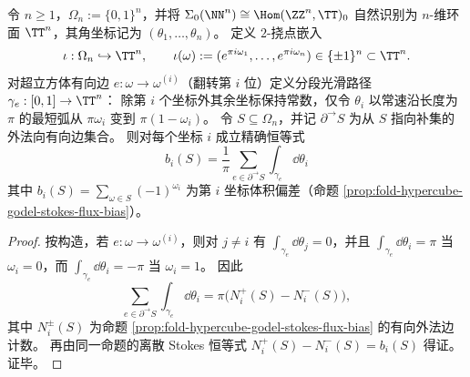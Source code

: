 
\begin{proposition}[\texorpdfstring{$\Sigma_0(\NN^n)=\TT^n$}{Sigma0(N^n)=T^n} 上的 de Rham 边界读出：离散 Stokes 的角色空间提升]\label{prop:cdim-hypercube-derham-stokes-lift}
令 \(n\ge 1\)，\(\Omega_n:=\{0,1\}^n\)，并将
\(
\Sigma_0(\NN^n)\cong \Hom(\ZZ^n,\TT)_0
\)
自然识别为 \(n\)-维环面 \(\TT^n\)，其角坐标记为 \((\theta_1,\dots,\theta_n)\)。
定义 \(2\)-挠点嵌入
\[
\iota:\Omega_n\hookrightarrow \TT^n,
\qquad
\iota(\omega):=(e^{\pi i\omega_1},\dots,e^{\pi i\omega_n})\in\{\pm 1\}^n\subset\TT^n.
\]
对超立方体有向边 \(e:\omega\to\omega^{(i)}\)（翻转第 \(i\) 位）定义分段光滑路径 \(\gamma_e:[0,1]\to\TT^n\)：
除第 \(i\) 个坐标外其余坐标保持常数，仅令 \(\theta_i\) 以常速沿长度为 \(\pi\) 的最短弧从 \(\pi\omega_i\) 变到 \(\pi(1-\omega_i)\)。
令 \(S\subseteq\Omega_n\)，并记 \(\partial^{\to}S\) 为从 \(S\) 指向补集的外法向有向边集合。
则对每个坐标 \(i\) 成立精确恒等式
\[
\boxed{\;
b_i(S)=\frac{1}{\pi}\sum_{e\in\partial^{\to}S}\int_{\gamma_e}\dd\theta_i\;}
\]
其中 \(b_i(S)=\sum_{\omega\in S}(-1)^{\omega_i}\) 为第 \(i\) 坐标体积偏差（命题 \ref{prop:fold-hypercube-godel-stokes-flux-bias}）。
\end{proposition}
\begin{proof}
按构造，若 \(e:\omega\to\omega^{(i)}\)，则对 \(j\neq i\) 有 \(\int_{\gamma_e}\dd\theta_j=0\)，并且
\(
\int_{\gamma_e}\dd\theta_i=\pi
\)
当 \(\omega_i=0\)，而
\(
\int_{\gamma_e}\dd\theta_i=-\pi
\)
当 \(\omega_i=1\)。
因此
\[
\sum_{e\in\partial^{\to}S}\int_{\gamma_e}\dd\theta_i
=\pi\bigl(N_i^+(S)-N_i^-(S)\bigr),
\]
其中 \(N_i^\pm(S)\) 为命题 \ref{prop:fold-hypercube-godel-stokes-flux-bias} 的有向外法边计数。
再由同一命题的离散 Stokes 恒等式 \(N_i^+(S)-N_i^-(S)=b_i(S)\) 得证。证毕。
\end{proof}

\endinput

